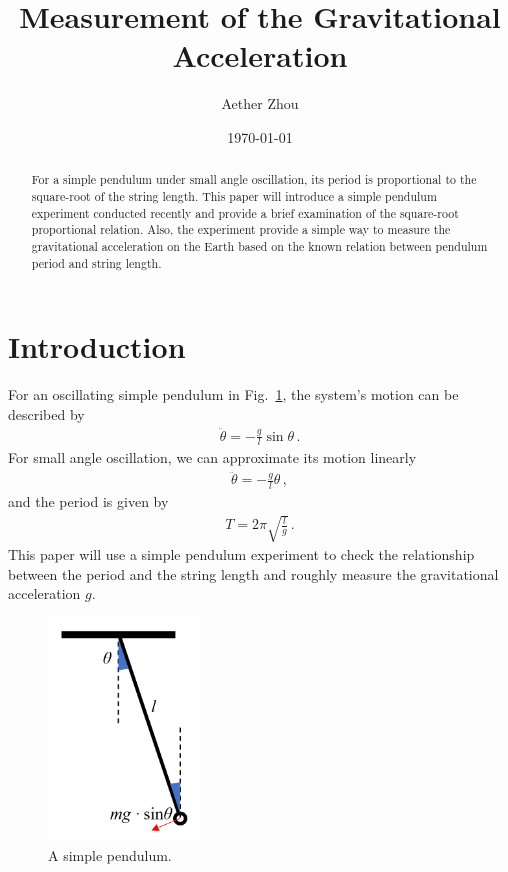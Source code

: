 \documentclass[twocolumn,preprintnumbers,amsmath,amssymb,longbibliography]{revtex4-1}
\begin{document}
\title{Measurement of the Gravitational Acceleration}%

\author{Aether Zhou}
%

\date{\today}%

\begin{abstract}
    For a simple pendulum under small angle oscillation, its period is proportional to the square-root of the string length. This paper will introduce a simple pendulum experiment conducted recently and provide a brief examination of the square-root proportional relation. Also, the experiment provide a simple way to measure the gravitational acceleration on the Earth based on the known relation between pendulum period and string length. 
\end{abstract}

\maketitle

\section{Introduction}
\label{intro}
For an oscillating simple pendulum in Fig.~\ref{sp}, the system's motion can be described by  
\begin{eqnarray}
\ddot{\theta}=-\frac{g}{l}\sin{\theta} \, .
\end{eqnarray}
For small angle oscillation, we can approximate its motion linearly
\begin{eqnarray}
\ddot{\theta}=-\frac{g}{l}\theta \, ,
\end{eqnarray}
and the period is given by
\begin{eqnarray}
T=2\pi\sqrt{\frac{l}{g}} \label{period}\, .
\end{eqnarray}
This paper will use a simple pendulum experiment to check the relationship between the period and the string length and roughly measure the gravitational acceleration $g$.
\begin{figure}[H]
\centering
\includegraphics[width=4cm]{simplePendulum.png}
\caption{\label{sp} A simple pendulum.} 
\end{figure}
\end{document}
